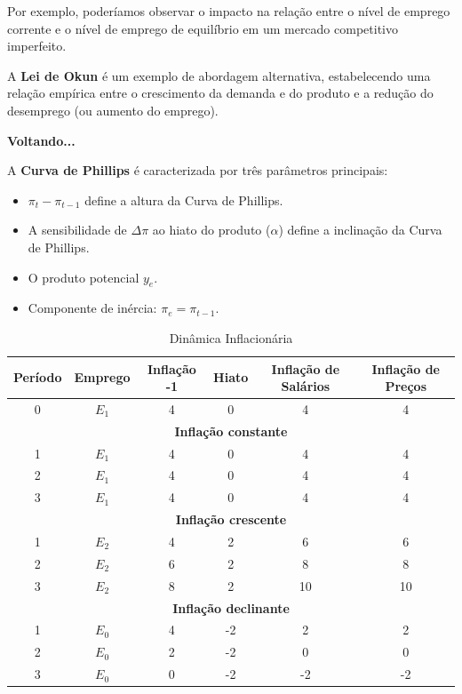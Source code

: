 \documentclass[a4paper,12pt]{article}[abntex2]
\begin{document}
Por exemplo, poderíamos observar o impacto na relação entre o nível de emprego corrente e o nível de emprego de equilíbrio em um mercado competitivo imperfeito. 

A \textbf{Lei de Okun} é um exemplo de abordagem alternativa, estabelecendo uma relação empírica entre o crescimento da demanda e do produto e a redução do desemprego (ou aumento do emprego).

\textbf{Voltando...}

A \textbf{Curva de Phillips} é caracterizada por três parâmetros principais:

\begin{itemize}
    \item \(\pi_t - \pi_{t-1}\) define a altura da Curva de Phillips.
    \item A sensibilidade de \(\Delta \pi\) ao hiato do produto (\(\alpha\)) define a inclinação da Curva de Phillips.
    \item O produto potencial \(y_e\).
    \item Componente de inércia: \(\pi_e = \pi_{t-1}\).
\end{itemize}


\begin{table}[H]
    \centering
    \caption{Dinâmica Inflacionária}
    \begin{tabular}{|c|c|c|c|c|c|}
        \hline
        Período & Emprego & Inflação -1 & Hiato & Inflação de Salários & Inflação de Preços \\
        \hline
        0 & \(E_1\) & 4 & 0 & 4 & 4 \\
        \hline
        \multicolumn{6}{c}{\textbf{Inflação constante}} \\
        \hline
        1 & \(E_1\) & 4 & 0 & 4 & 4 \\
        2 & \(E_1\) & 4 & 0 & 4 & 4 \\
        3 & \(E_1\) & 4 & 0 & 4 & 4 \\
        \hline
        \multicolumn{6}{c}{\textbf{Inflação crescente}} \\
        \hline
        1 & \(E_2\) & 4 & 2 & 6 & 6 \\
        2 & \(E_2\) & 6 & 2 & 8 & 8 \\
        3 & \(E_2\) & 8 & 2 & 10 & 10 \\
        \hline
        \multicolumn{6}{c}{\textbf{Inflação declinante}} \\
        \hline
        1 & \(E_0\) & 4 & -2 & 2 & 2 \\
        2 & \(E_0\) & 2 & -2 & 0 & 0 \\
        3 & \(E_0\) & 0 & -2 & -2 & -2 \\
        \hline
    \end{tabular}
\end{table}
\end{document}
